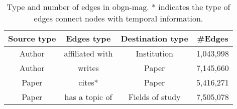 \begin{table}[!h]
    \small
        \vspace{-10pt}
        \centering
        \caption{Type and number of edges in obgn-mag. * indicates the type of edges connect nodes with temporal information.}
    
        \begin{tabular}{cccc}
        \hline
        {Source   type} & {Edges type}     & \multicolumn{1}{c|}{Destination   type} & \#Edges   \\ \hline
        {Author} & {affiliated with} & \multicolumn{1}{c|}{Institution} & 1,043,998 \\ 
        {Author} & {writes}          & \multicolumn{1}{c|}{Paper}       & 7,145,660 \\ 
        Paper         & cites*         & \multicolumn{1}{c|}{Paper}              & 5,416,271 \\ 
        Paper         & has a topic of & \multicolumn{1}{c|}{Fields of study}    & 7,505,078 \\ \hline
        \end{tabular}
        \label{table:edge}
    
    \end{table}
    